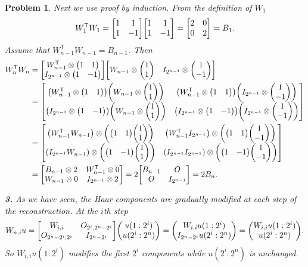 \documentclass{article}
\newcommand{\subno}[1]{\par\noindent\textbf{#1}}
\newcommand{\T}{\mathsf{T}}
\theoremstyle{pprop}
\newtheorem{problem}{Problem}[section]
\begin{document}
\begin{problem}
Next we use proof by induction. From the definition of $W_1$
\[
W_1^\T W_1 = \mqty[1 & 1 \\ 1 & -1]\mqty[1 & 1 \\ 1 & -1]=\mqty[2 & 0 \\ 0 & 2]=B_1.
\]
Assume that $W_{n-1}^\T W_{n-1}=B_{n-1}$. Then 
\begin{align*}
  W_{n}^\T W_{n} & = \mqty[W_{n-1}^\T \otimes \mqty(1 & 1) \\ I_{2^{n-1}} \otimes \mqty(1 & -1) ]
  \mqty[W_{n-1}\otimes \mqty(1 \\ 1) & I_{2^{n-1}}  \otimes \mqty(1 \\ -1) ]  \\
  & = \mqty[
\qty(W_{n-1}^\T \otimes \mqty(1 & 1))\qty(W_{n-1}\otimes \mqty(1 \\ 1))  & \qty(W_{n-1}^\T \otimes \mqty(1 & 1))\qty(I_{2^{n-1}}\otimes \mqty(1 \\ -1)) \\
\qty(I_{2^{n-1}} \otimes \mqty(1 & -1))\qty(W_{n-1}\otimes \mqty(1 \\ 1))  & \qty(I_{2^{n-1}}\otimes \mqty(1 & -1))\qty(I_{2^{n-1}}\otimes \mqty(1 \\ -1)) 
  ] \\
 & = \mqty[
\qty(W_{n-1}^\T W_{n-1})\otimes \qty(\mqty(1 & 1)\mqty(1 \\ 1)) & \qty(W_{n-1}^\T I_{2^{n-1}}) \otimes  \qty(\mqty(1 & 1)\mqty(1 \\ -1)) \\
\qty(I_{2^{n-1}}W_{n-1}) \otimes \qty(\mqty(1 & -1)\mqty(1 \\ 1)) & \qty(I_{2^{n-1}}I_{2^{n-1}})\otimes \qty(\mqty(1 & -1)\mqty(1 \\ -1)) 
 ]  \\
 & = \mqty[
B_{n-1} \otimes 2 &  W_{n-1}^\T  \otimes  0 \\
W_{n-1} \otimes 0 & I_{2^{n-1}} \otimes 2 
 ]=2 \mqty[
B_{n-1}  &  O \\
O & I_{2^{n-1}} 
 ] =2 B_n.
\end{align*}
\subno{3.} As we have seen, the Haar components are gradually modified at each step of the reconstruction. At the $i$th step 
\[
W_{n,i} u = \mqty[W_{i,i}  & O_{2^i,2^n-2^i} \\ O_{2^n-2^i,2^i} & I_{2^n-2^i}] \mqty(u(1 : 2^i) \\ u(2^i : 2^n) )
= \mqty(W_{i,i}u(1 : 2^i) \\ I_{2^n-2^i}u(2^i : 2^n))=\mqty(W_{i,i}u(1 : 2^i) \\ u(2^i : 2^n)).
\] 
So $W_{i,i}u(1 : 2^i)$ modifies the first $2^i$ components while $u(2^i : 2^n)$ is unchanged.


\end{problem}
\end{document}
